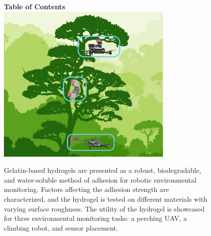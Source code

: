 






\begin{figure}
\textbf{Table of Contents}\\
\medskip
  \includegraphics{figures/toc/toc.pdf}
  \medskip
  \caption*{Gelatin-based hydrogels are presented as a robust, biodegradable, and water-soluble method of adhesion for robotic environmental monitoring. Factors affecting the adhesion strength are characterized, and the hydrogel is tested on different materials with varying surface roughness. The utility of the hydrogel is showcased for three environmental monitoring tasks: a perching UAV, a climbing robot, and sensor placement.}
\end{figure}



